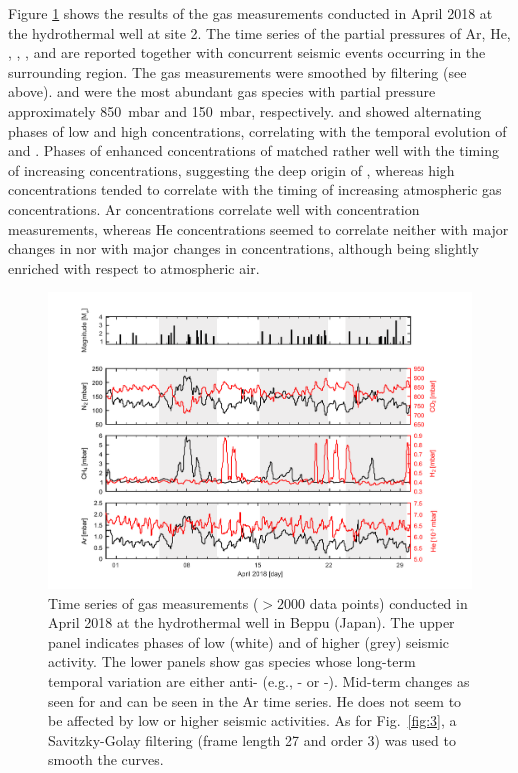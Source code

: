 Figure \ref{fig:4} shows the results of the gas measurements conducted in April 2018 at the hydrothermal well at site 2.
The time series of the partial pressures of Ar, He, , , , and  are reported together with concurrent seismic events occurring in the surrounding region.
The gas measurements were smoothed by filtering (see above).
 and  were the most abundant gas species with partial pressure approximately \SI{850}{\milli\bar} and \SI{150}{\milli\bar}, respectively.
 and  showed alternating phases of low and high concentrations, correlating with the temporal evolution of  and .
Phases of enhanced concentrations of  matched rather well with the timing of increasing  concentrations, suggesting the deep origin of , whereas high  concentrations tended to correlate with the timing of increasing atmospheric gas concentrations.
Ar concentrations correlate well with  concentration measurements, whereas He concentrations seemed to correlate neither with major changes in  nor with major changes in  concentrations, although being slightly enriched with respect to atmospheric air.

\begin{figure}[H]
\begin{center}
\includegraphics[width=1\textwidth]{chapters/02_chap1/figures/figure_4.pdf}
\end{center}
\caption{Time series of gas measurements ($> 2000$ data points) conducted in April 2018 at the hydrothermal well in Beppu (Japan).
The upper panel indicates phases of low (white) and of higher (grey) seismic activity. 
The lower panels show gas species whose long-term temporal variation are either anti- (e.g., - or -).
Mid-term changes as seen for  and  can be seen in the Ar time series. 
He does not seem to be affected by low or higher seismic activities. 
As for Fig.~\ref{fig:3}, a Savitzky-Golay filtering (frame length 27 and order 3) was used to smooth the curves.
}
\label{fig:4}
\end{figure}


